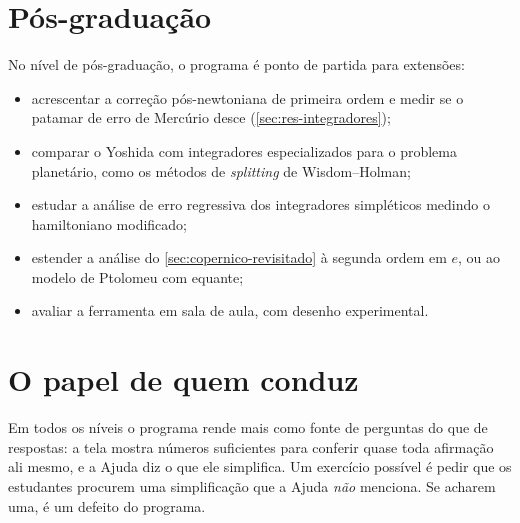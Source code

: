 \section{Pós-graduação}

No nível de pós-graduação, o programa é ponto de partida para extensões:

\begin{itemize}
  \item acrescentar a correção pós-newtoniana de primeira ordem e medir se o patamar de erro de Mercúrio desce (\autoref{sec:res-integradores});
  \item comparar o Yoshida com integradores especializados para o problema planetário, como os métodos de \emph{splitting} de Wisdom--Holman;
  \item estudar a análise de erro regressiva dos integradores simpléticos medindo o hamiltoniano modificado;
  \item estender a análise do \autoref{sec:copernico-revisitado} à segunda ordem em $e$, ou ao modelo de Ptolomeu com equante;
  \item avaliar a ferramenta em sala de aula, com desenho experimental.
\end{itemize}

\section{O papel de quem conduz}

Em todos os níveis o programa rende mais como fonte de perguntas do que de respostas: a tela mostra números suficientes para conferir quase toda afirmação ali mesmo, e a Ajuda diz o que ele simplifica. Um exercício possível é pedir que os estudantes procurem uma simplificação que a Ajuda \emph{não} menciona. Se acharem uma, é um defeito do programa.
